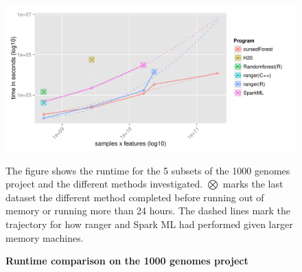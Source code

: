 \documentclass[10pt,letterpaper]{article}
\begin{document}
\begin{figure}[tbhp] 
    \caption{\textbf{Runtime comparison on the 1000 genomes project}} 
    \label{figure:synth1}
      \includegraphics[totalheight=8cm]{./figs/1000genomesRuntime.pdf}
    \begin{flushleft} 
      The figure shows the runtime for the 5 subsets of the 1000 genomes project and the different methods investigated. $\bigotimes$ marks the last dataset the different method completed before running out of memory or running more than 24 hours. The dashed lines mark the trajectory for how ranger and Spark ML had performed given larger memory machines. 
    \end{flushleft}
\end{figure}


\iffalse
\end{document}
